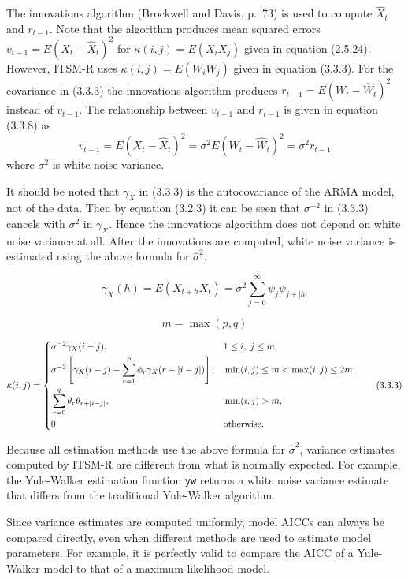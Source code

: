 \documentclass[11pt]{article}
\begin{document}
The innovations algorithm (Brockwell and Davis, p.~73)
is used to compute $\hat X_t$ and $r_{t-1}$.
Note that the algorithm produces mean squared errors
$v_{t-1}=E(X_t-\hat X_t)^2$ for $\kappa(i,j)=E(X_iX_j)$
given in equation (2.5.24).
However, ITSM-R uses $\kappa(i,j)=E(W_iW_j)$ given in
equation (3.3.3).
For the covariance in (3.3.3)
the innovations algorithm produces $r_{t-1}=E(W_t-\hat W_t)^2$
instead of $v_{t-1}$.
The relationship between $v_{t-1}$ and $r_{t-1}$ is given in
equation (3.3.8) as
\[
v_{t-1}=E(X_t-\hat X_t)^2=\sigma^2E(W_t-\hat W_t)^2=\sigma^2r_{t-1}
\]
where $\sigma^2$ is white noise variance.

It should be noted that $\gamma_X$ in (3.3.3) is
the autocovariance of the ARMA model, not of the data.
Then by equation (3.2.3) it can be seen that $\sigma^{-2}$ in (3.3.3)
cancels with $\sigma^2$ in $\gamma_X$.
Hence the innovations algorithm does not depend on white noise variance at all.
After the innovations are computed, white noise variance is estimated
using the above formula for $\hat\sigma^2$.

\[
\gamma_X(h)=E(X_{t+h}X_t)=\sigma^2\sum_{j=0}^\infty\psi_j\psi_{j+|h|}\tag{3.2.3}
\]

\[
m=\max(p,q)\tag{3.3.2}
\]

\[
\kappa(i,j)=\left\{
\begin{aligned}
&\sigma^{-2}\gamma_X(i-j), && 1\le i,\;j\le m\\
&\sigma^{-2}\left[
\gamma_X(i-j)-\sum_{r=1}^p\phi_r\gamma_X(r-|i-j|)\right],
&& \min(i,j)\le m<\max(i,j)\le2m,\\
&\sum_{r=0}^q\theta_r\theta_{r+|i-j|},&&\min(i,j)>m,\\
&0&&\hbox{otherwise.}
\end{aligned}
\right.\tag{3.3.3}
\]

Because all estimation methods use the above formula for $\hat\sigma^2$,
variance estimates computed by ITSM-R are different from what is normally
expected.
For example, the Yule-Walker estimation function {\tt yw} returns a white noise
variance estimate that differs from the traditional Yule-Walker algorithm.

Since variance estimates are computed uniformly,
model AICCs can always be compared directly,
even when different methods are used to estimate model parameters.
For example, it is perfectly valid to compare the AICC of a Yule-Walker
model to that of a maximum likelihood model.
\end{document}
